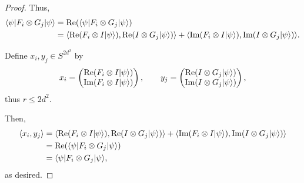 \begin{proof}
%		
%		
		Thus,
		\begin{align*}
			\dl{\psi} F_i\tensor G_j \dr{\psi} &=\Real(\dl{\psi} F_i\tensor G_j \dr{\psi})\\
			&=\sclr{\Real(F_i\tensor I \dr{\psi})}{\Real(I\tensor G_j \dr{\psi})}+\sclr{\Imag(F_i\tensor I \dr{\psi})}{\Imag(I\tensor G_j \dr{\psi})}.
		\end{align*}
		
		\noindent Define $x_i,y_j \in S^{2d^2}$ by
		\begin{align}
			x_i = \begin{pmatrix}
				\Real(F_i\tensor I \dr{\psi}) \\
				\Imag(F_i\tensor I \dr{\psi})
			\end{pmatrix}, \qquad
			y_j = \begin{pmatrix}
				\Real(I\tensor G_j \dr{\psi})\\
				\Imag(I\tensor G_j \dr{\psi})
			\end{pmatrix}, 
		\end{align}
		thus $r\leq 2d^2$.
		
		Then, 
		\begin{align*}
			\sclr{x_i}{y_j} &= \sclr{\Real(F_i\tensor I \dr{\psi})}{\Real(I\tensor G_j \dr{\psi})}+ \sclr{\Imag(F_i\tensor I \dr{\psi})}{\Imag(I\tensor G_j \dr{\psi})}\\
			&= \Real(\dl{\psi} F_i\tensor G_j \dr{\psi}) \\
			&= \dl{\psi} F_i\tensor G_j \dr{\psi},
		\end{align*}
		as desired.
	\end{proof}
	
